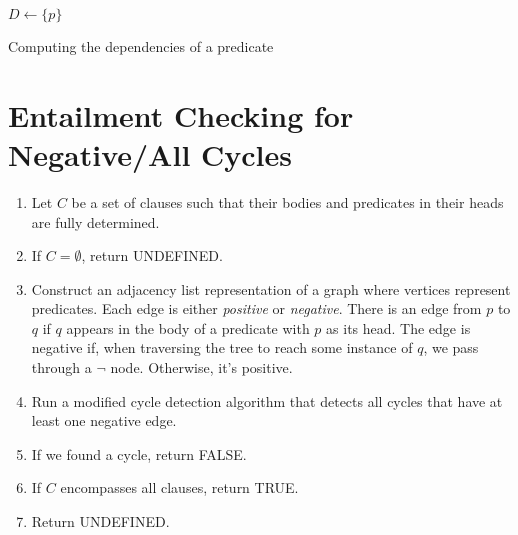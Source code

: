 \documentclass[runningheads]{llncs}
\begin{document}
\begin{algorithm}
   {
    $D \gets \{ p \}$\;
    \;
  }
  \caption{Computing the dependencies of a predicate}
\end{algorithm}

\section{Entailment Checking for Negative/All Cycles}

\begin{enumerate}
\item Let $C$ be a set of clauses such that their bodies and predicates in their
  heads are fully determined.
\item If $C = \emptyset$, return UNDEFINED.
\item Construct an adjacency list representation of a graph where vertices
  represent predicates. Each edge is either \emph{positive} or \emph{negative}.
  There is an edge from $p$ to $q$ if $q$ appears in the body of a predicate
  with $p$ as its head. The edge is negative if, when traversing the tree to
  reach some instance of $q$, we pass through a $\neg$ node. Otherwise, it's
  positive.
\item Run a modified cycle detection algorithm that detects all cycles that have
  at least one negative edge.
\item If we found a cycle, return FALSE.
\item If $C$ encompasses all clauses, return TRUE.
\item Return UNDEFINED.
\end{enumerate}
\end{document}
